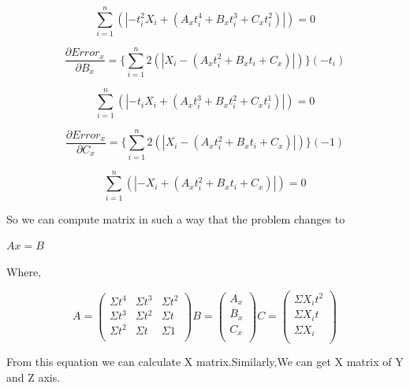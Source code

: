 \begin{equation} 
\displaystyle\sum_{i=1}^{n}(|{-t_i^2}X_i+(A_x t_i^4+B_x t_i^3+C_x t_i^2)|) = 0
\end{equation}

\begin{equation} 
 \frac{\partial Error_x}{\partial B_x} = {\lbrace\displaystyle\sum_{i=1}^{n}2(|X_i-(A_xt_i^2+B_x t_i +C_x)|)\rbrace}({-t_i})
\end{equation}

\begin{equation} 
\displaystyle\sum_{i=1}^{n}(|{-t_i}X_i+(A_x t_i^3+B_x t_i^2+C_x t_i^1)|) = 0
\end{equation}

\begin{equation} 
 \frac{\partial Error_x}{\partial C_x} = {\lbrace\displaystyle\sum_{i=1}^{n}2(|X_i-(A_xt_i^2+B_x t_i +C_x)|)\rbrace}({-1})
\end{equation}

\begin{equation} 
\displaystyle\sum_{i=1}^{n}(|-X_i+(A_x t_i^2+B_x t_i+C_x)|) = 0
\end{equation}

So we can compute matrix in such a way that the problem changes to 

$Ax=B$

Where, 

\begin{equation}
A = 
\begin{pmatrix}
  \Sigma t^4 & \Sigma t^3 & \Sigma t^2\\
  \Sigma t^3 & \Sigma t^2 & \Sigma t\\
  \Sigma t^2 & \Sigma t & \Sigma 1\\
 \end{pmatrix}
B = 
\begin{pmatrix}
  A_x \\
  B_x \\
  C_x \\
 \end{pmatrix}
 C = 
\begin{pmatrix}
  \Sigma X_i t ^2 \\
  \Sigma X_i t \\
  \Sigma X_i \\
 \end{pmatrix}
\end{equation}

From this equation we can calculate X matrix.Similarly,We can get X matrix of Y and Z axis.

